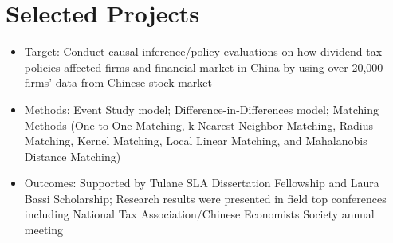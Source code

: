\documentclass{resume}
\begin{document}
\section{Selected Projects}
\begin{itemize}
  \item Target: Conduct causal inference/policy evaluations on how dividend tax policies affected firms and financial market in China by using over 20,000 firms' data from Chinese stock market 
  \item Methods: Event Study model; Difference-in-Differences model; Matching Methods (One-to-One Matching, k-Nearest-Neighbor Matching, Radius Matching, Kernel Matching, Local Linear Matching, and Mahalanobis Distance Matching)
  \item Outcomes: Supported by Tulane SLA Dissertation Fellowship and Laura Bassi Scholarship; Research results were presented in field top conferences including National Tax Association/Chinese Economists Society annual meeting
\end{itemize}
\end{document}
